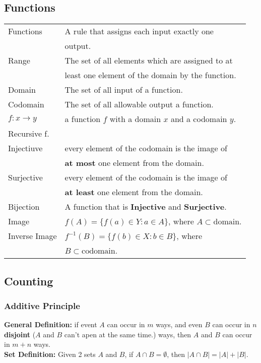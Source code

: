 \documentclass[5pt]{article}
\begin{document}
\begin{multicols}{2}
\begin{tabular}{ll}
\end{tabular}

\subsection{Functions}

\begin{tabular}{ll}
    Functions           & A rule that assigns each input exactly one \\
                        & output.\\
    Range               & The set of all elements which are assigned to at\\
                        & least one element of the domain by the function.\\
    Domain              & The set of all input of a function.\\
    Codomain            & The set of all allowable output a function.\\
    $f:x\rightarrow y$   & a function $f$ with a domain $x$ and a codomain $y$.\\
    Recursive f.        & \\
    Injectiuve          & every element of the codomain is the image  of \\
                        & \textbf{at most} one element from the domain.\\
    Surjective          & every element of the codomain is the image  of \\
                        & \textbf{at least} one element from the domain.\\
    Bijection           & A function that is \textbf{Injective} and \textbf{Surjective}.\\
    Image               & $f(A)=\{f(a)\in Y: a\in A\}$, where $A\subset\text{domain}$.\\
    Inverse Image       & $f^{-1}(B)=\{f(b)\in X: b\in B\}$, where \\
                        & $B\subset\text{codomain}$.\\
\end{tabular}

\subsection{Counting}
\subsubsection{Additive Principle}
\textbf{General Definition:} 
if event $A$ can occur in $m$ ways, and even $B$ can occur in $n$ \textbf{disjoint} ($A$ and $B$ can't apen at the same time.) ways, then $A$ and $B$ can occur in $m+n$ ways.\\   
\textbf{Set Definition:} Given 2 sets $A$ and $B$, if $A\cap B =\emptyset$, then $|A\cap B| = |A| + |B|$.



\end{multicols}
\end{document}

